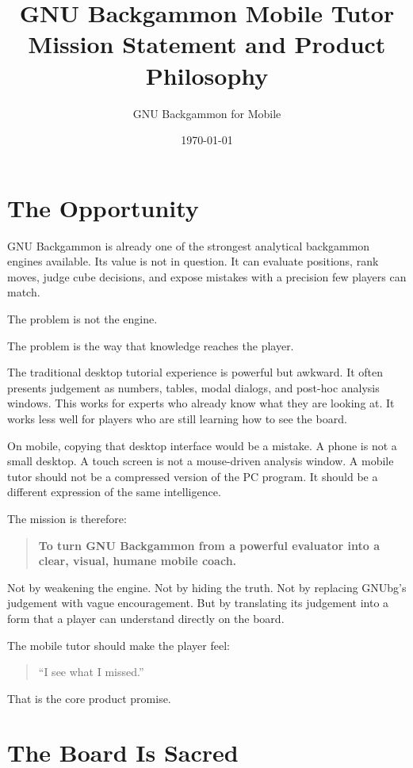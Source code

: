 \documentclass[11pt,a4paper]{article}
\title{GNU Backgammon Mobile Tutor\\Mission Statement and Product Philosophy}
\author{GNU Backgammon for Mobile}
\date{\today}
\begin{document}
\maketitle

\section{The Opportunity}

GNU Backgammon is already one of the strongest analytical backgammon engines available. Its value is not in question. It can evaluate positions, rank moves, judge cube decisions, and expose mistakes with a precision few players can match.

The problem is not the engine.

The problem is the way that knowledge reaches the player.

The traditional desktop tutorial experience is powerful but awkward. It often presents judgement as numbers, tables, modal dialogs, and post-hoc analysis windows. This works for experts who already know what they are looking at. It works less well for players who are still learning how to see the board.

On mobile, copying that desktop interface would be a mistake. A phone is not a small desktop. A touch screen is not a mouse-driven analysis window. A mobile tutor should not be a compressed version of the PC program. It should be a different expression of the same intelligence.

The mission is therefore:

\begin{quote}
\textbf{To turn GNU Backgammon from a powerful evaluator into a clear, visual, humane mobile coach.}
\end{quote}

Not by weakening the engine. Not by hiding the truth. Not by replacing GNUbg's judgement with vague encouragement. But by translating its judgement into a form that a player can understand directly on the board.

The mobile tutor should make the player feel:

\begin{quote}
``I see what I missed.''
\end{quote}

That is the core product promise.

\section{The Board Is Sacred}
\end{document}
